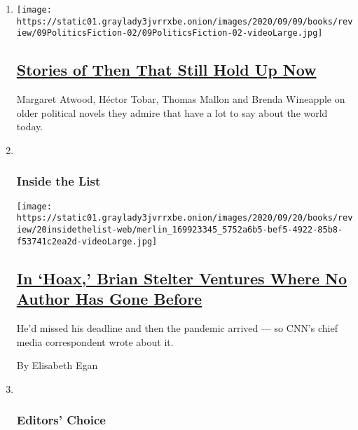 \begin{enumerate}
\def\labelenumi{\arabic{enumi}.}
\item
  \texttt{[image: https://static01.graylady3jvrrxbe.onion/images/2020/09/09/books/review/09PoliticsFiction-02/09PoliticsFiction-02-videoLarge.jpg]}

  \hypertarget{stories-of-then-that-still-hold-up-now}{%
  \subsection{\texorpdfstring{\href{/2020/09/11/books/review/political-novels-mephisto-klaus-mann-1876-gore-vidal-senor-presidente-miguel-angel-asturias-all-kings-men-robert-penn-warren.html}{Stories
  of Then That Still Hold Up
  Now}}{Stories of Then That Still Hold Up Now}}\label{stories-of-then-that-still-hold-up-now}}

  Margaret Atwood, Héctor Tobar, Thomas Mallon and Brenda Wineapple on
  older political novels they admire that have a lot to say about the
  world today.
\item ~
  \hypertarget{inside-the-list}{%
  \subsubsection{Inside the List}\label{inside-the-list}}

  \texttt{[image: https://static01.graylady3jvrrxbe.onion/images/2020/09/20/books/review/20insidethelist-web/merlin\_169923345\_5752a6b5-bef5-4922-85b8-f53741c2ea2d-videoLarge.jpg]}

  \hypertarget{in-hoax-brian-stelter-ventures-where-no-author-has-gone-before}{%
  \subsection{\texorpdfstring{\href{/2020/09/10/books/review/brian-stelter-hoax.html}{In
  `Hoax,' Brian Stelter Ventures Where No Author Has Gone
  Before}}{In `Hoax,' Brian Stelter Ventures Where No Author Has Gone Before}}\label{in-hoax-brian-stelter-ventures-where-no-author-has-gone-before}}

  He'd missed his deadline and then the pandemic arrived --- so CNN's
  chief media correspondent wrote about it.

  By Elisabeth Egan
\item ~
  \hypertarget{editors-choice}{%
  \subsubsection{Editors' Choice}\label{editors-choice}}


\end{enumerate}
